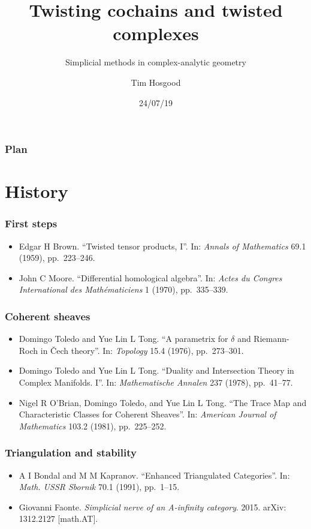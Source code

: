 \documentclass{beamer}
\title{Twisting cochains and twisted complexes}
\subtitle{Simplicial methods in complex-analytic geometry}
\author{Tim Hosgood}
\institute{Université d'Aix-Marseille}
\date{24/07/19}
\begin{document}
    \begin{frame}
        \titlepage
    \end{frame}

    \begin{frame}
        \frametitle{Plan}
        \tableofcontents
    \end{frame}


    \section{History}

        \begin{frame}\frametitle{First steps}
            \begin{itemize}
                \item Edgar H Brown. ``Twisted tensor products, I''. In: \emph{Annals of Mathematics} 69.1 (1959), pp.~223--246.
                \item John C Moore. ``Differential homological algebra''. In: \emph{Actes du Congres International des Mathématiciens} 1 (1970), pp.~335--339.
            \end{itemize}
        \end{frame}

        \begin{frame}\frametitle{Coherent sheaves}
            \begin{itemize}
                \item Domingo Toledo and Yue Lin L Tong. ``A parametrix for $\delta$ and Riemann-Roch in Čech theory''. In: \emph{Topology} 15.4 (1976), pp.~273--301.
                \item Domingo Toledo and Yue Lin L Tong. ``Duality and Intersection Theory in Complex Manifolds. I''. In: \emph{Mathematische Annalen} 237 (1978), pp.~41--77.
                \item Nigel R O'Brian, Domingo Toledo, and Yue Lin L Tong. ``The Trace Map and Characteristic Classes for Coherent Sheaves''. In: \emph{American Journal of Mathematics} 103.2 (1981), pp.~225--252.
            \end{itemize}
        \end{frame}

        \begin{frame}\frametitle{Triangulation and stability}
            \begin{itemize}
                \item A I Bondal and M M Kapranov. ``Enhanced Triangulated Categories''. In: \emph{Math. USSR Sbornik} 70.1 (1991), pp.~1--15.
                \item Giovanni Faonte. \emph{Simplicial nerve of an A-infinity category}. 2015. arXiv: 1312.2127 [math.AT].
            \end{itemize}
        \end{frame}
\end{document}
